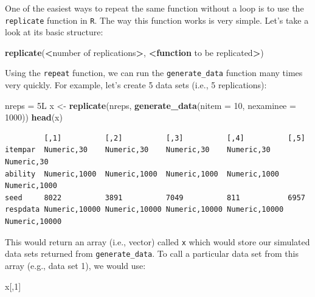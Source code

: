 \documentclass[
]{book}
\newenvironment{Shaded}{\begin{snugshade}}{\end{snugshade}}
\newcommand{\ControlFlowTok}[1]{\textcolor[rgb]{0.13,0.29,0.53}{\textbf{#1}}}
\newcommand{\DataTypeTok}[1]{\textcolor[rgb]{0.13,0.29,0.53}{#1}}
\newcommand{\DecValTok}[1]{\textcolor[rgb]{0.00,0.00,0.81}{#1}}
\newcommand{\KeywordTok}[1]{\textcolor[rgb]{0.13,0.29,0.53}{\textbf{#1}}}
\newcommand{\NormalTok}[1]{#1}
\newcommand{\OperatorTok}[1]{\textcolor[rgb]{0.81,0.36,0.00}{\textbf{#1}}}
\newcommand{\StringTok}[1]{\textcolor[rgb]{0.31,0.60,0.02}{#1}}
\begin{document}
One of the easiest ways to repeat the same function without a loop is to use the \texttt{replicate} function in \texttt{R}. The way this function works is very simple. Let's take a look at its basic structure:

\begin{Shaded}
\begin{Highlighting}[]
\KeywordTok{replicate}\NormalTok{(}\OperatorTok{<}\NormalTok{number of replications}\OperatorTok{>}\NormalTok{, }\OperatorTok{<}\ControlFlowTok{function}\NormalTok{ to be replicated}\OperatorTok{>}\NormalTok{)}
\end{Highlighting}
\end{Shaded}

Using the \texttt{repeat} function, we can run the \texttt{generate\_data} function many times very quickly. For example, let's create 5 data sets (i.e., 5 replications):

\begin{Shaded}
\begin{Highlighting}[]
\NormalTok{nreps =}\StringTok{ }\NormalTok{5L}
\NormalTok{x <-}\StringTok{ }\KeywordTok{replicate}\NormalTok{(nreps, }\KeywordTok{generate_data}\NormalTok{(}\DataTypeTok{nitem =} \DecValTok{10}\NormalTok{, }\DataTypeTok{nexaminee =} \DecValTok{1000}\NormalTok{))}
\KeywordTok{head}\NormalTok{(x)}
\end{Highlighting}
\end{Shaded}

\begin{verbatim}
         [,1]          [,2]          [,3]          [,4]          [,5]         
itempar  Numeric,30    Numeric,30    Numeric,30    Numeric,30    Numeric,30   
ability  Numeric,1000  Numeric,1000  Numeric,1000  Numeric,1000  Numeric,1000 
seed     8022          3891          7049          811           6957         
respdata Numeric,10000 Numeric,10000 Numeric,10000 Numeric,10000 Numeric,10000
\end{verbatim}

This would return an array (i.e., vector) called \texttt{x} which would store our simulated data sets returned from \texttt{generate\_data}. To call a particular data set from this array (e.g., data set 1), we would use:

\begin{Shaded}
\begin{Highlighting}[]
\NormalTok{x[,}\DecValTok{1}\NormalTok{]}
\end{Highlighting}
\end{Shaded}
\end{document}
